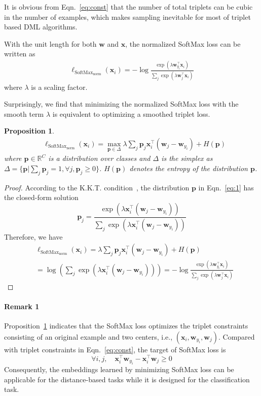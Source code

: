 \documentclass[10pt,twocolumn,letterpaper]{article}
\def \R {\mathbb{R}}
\def \x {\mathbf{x}}
\def \p {\mathbf{p}}
\def \w {\mathbf{w}}
\newtheorem{prop}{Proposition}
\begin{document}
It is obvious from Eqn.~\ref{eq:const} that the number of total triplets can be cubic in the number of examples, which makes sampling inevitable for most of triplet based DML algorithms. 

With the unit length for both $\w$ and $\x$, the normalized SoftMax loss can be written as 
\begin{eqnarray}\label{eq:SoftMax}
\ell_{\mathrm{SoftMax_{norm}}}(\x_i) = -\log\frac{\exp(\lambda \w_{y_i}^\top \x_i)}{\sum_j \exp(\lambda \w_j^\top \x_i)}
\end{eqnarray}
where $\lambda$ is a scaling factor.

Surprisingly, we find that minimizing the normalized SoftMax loss with the smooth term $\lambda$ is equivalent to optimizing a smoothed triplet loss.
\begin{prop}\label{prop:1}
\begin{align}\label{eq:1}
&\ell_{\mathrm{SoftMax_{norm}}}(\x_i) = \max_{\p\in\Delta} \lambda\sum_j \p_j \x_i^\top(\w_j - \w_{y_i})+ H(\p)
\end{align}
where $\p\in\R^C$ is a distribution over classes and $\Delta$ is the simplex as $\Delta=\{\p|\sum_j \p_j=1,\forall j,\p_j\geq 0\}$. $H(\p)$ denotes the entropy of the distribution $\p$.
\end{prop}
\begin{proof}

According to the K.K.T. condition~\cite{boyd2004convex}, the distribution $\p$ in Eqn.~\ref{eq:1} has the closed-form solution
\[\p_j = \frac{\exp(\lambda \x_i^\top(\w_j - \w_{y_i}))}{\sum_j \exp(\lambda \x_i^\top(\w_j - \w_{y_i}))}\]
Therefore, we have
\small{
\begin{align*}
&\ell_{\mathrm{SoftMax_{norm}}}(\x_i) =\lambda\sum_j \p_j \x_i^\top(\w_j - \w_{y_i})+ H(\p)\\
&=\log(\sum_j \exp(\lambda \x_i^\top(\w_j - \w_{y_i})))= -\log\frac{\exp(\lambda \w_{y_i}^\top \x_i)}{\sum_j \exp(\lambda \w_j^\top \x_i)}
\end{align*}}
\end{proof}
\paragraph{Remark 1} Proposition~\ref{prop:1} indicates that the SoftMax loss optimizes the triplet constraints consisting of an original example and two centers, i.e., $(\x_i,\w_{y_i},\w_j)$. Compared with triplet constraints in Eqn.~\ref{eq:const}, the target of SoftMax loss is
\[\forall i, j, \quad \x_i^\top \w_{y_i} - \x_i^\top \w_{j} \geq 0\]
Consequently, the embeddings learned by minimizing SoftMax loss can be applicable for the distance-based tasks while it is designed for the classification task.
\end{document}
